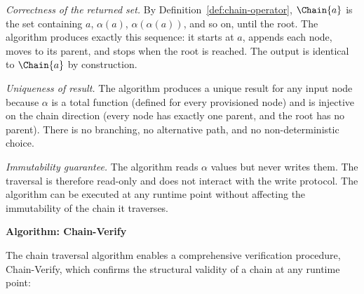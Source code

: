 \textit{Correctness of the returned set.} By Definition~\ref{def:chain-operator}, $\Chain{a}$ is the set containing $a$, $\alpha(a)$, $\alpha(\alpha(a))$, and so on, until the root. The algorithm produces exactly this sequence: it starts at $a$, appends each node, moves to its parent, and stops when the root is reached. The output is identical to $\Chain{a}$ by construction.

\textit{Uniqueness of result.} The algorithm produces a unique result for any input node because $\alpha$ is a total function (defined for every provisioned node) and is injective on the chain direction (every node has exactly one parent, and the root has no parent). There is no branching, no alternative path, and no non-deterministic choice.

\textit{Immutability guarantee.} The algorithm reads $\alpha$ values but never writes them. The traversal is therefore read-only and does not interact with the write protocol. The algorithm can be executed at any runtime point without affecting the immutability of the chain it traverses.

\medskip
\noindent\textbf{Algorithm: Chain-Verify}

The chain traversal algorithm enables a comprehensive verification procedure, Chain-Verify, which confirms the structural validity of a chain at any runtime point:

